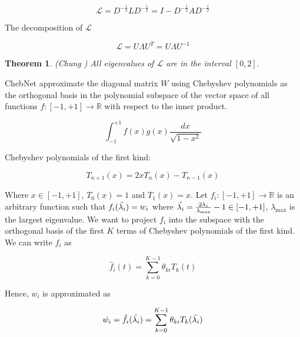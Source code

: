 \documentclass{article}
\newtheorem{theorem}{Theorem}
\begin{document}
    \begin{equation}
        \mathcal{L} = D^{-\frac{1}{2}} L D^{-\frac{1}{2}} = I - D^{-\frac{1}{2}} A D^{-\frac{1}{2}}
    \end{equation}

    The decomposition of $\mathcal{L}$

    \begin{equation}
        \mathcal{L} = U \Lambda U^T = U \Lambda U^{-1}
    \end{equation}

    \begin{theorem}(Chung \cite{chung1997spectral})
        All eigenvalues of $\mathcal{L}$ are in the interval $[0, 2]$.
    \end{theorem}

    ChebNet \cite{tang2019chebnet} approximate the diagonal matrix $W$ using Chebyshev polynomials as the orthogonal basis in the polynomial subspace of the vector space of all functions $f: [-1, +1] \to \mathbb{R}$ with respect to the inner product.

    \begin{equation}
        \int_{-1}^{+1} f(x) g(x) \frac{dx}{\sqrt{1-x^2}}
    \end{equation}

    Chebyshev polynomials of the first kind:

    \begin{equation}
        T_{n+1}(x) = 2x T_n(x) - T_{n-1}(x)
    \end{equation}

    Where $x \in [-1, +1]$, $T_0(x) = 1$ and $T_1(x) = x$. Let $f_i: [-1, +1] \to \mathbb{R}$ is an arbitrary function such that $f_i(\Tilde{\lambda_i}) = w_i$ where $\Tilde{\lambda_i} = \frac{2 \lambda_i}{\lambda_{\max}} - 1 \in [-1, +1]$, $\lambda_{\max}$ is the largest eigenvalue. We want to project $f_i$ into the subspace with the orthogonal basis of the first $K$ terms of Chebyshev polynomials of the first kind. We can write $f_i$ as

    \begin{equation}
        \hat{f}_i(t) = \sum_{k=0}^{K-1} \theta_{k i} T_k(t)
    \end{equation}

    Hence, $w_i$ is approximated as

    \begin{equation}
        \hat{w_i} = \hat{f}_i(\Tilde{\lambda_i}) = \sum_{k=0}^{K-1} \theta_{k i} T_k(\Tilde{\lambda_i})
    \end{equation}
\end{document}
